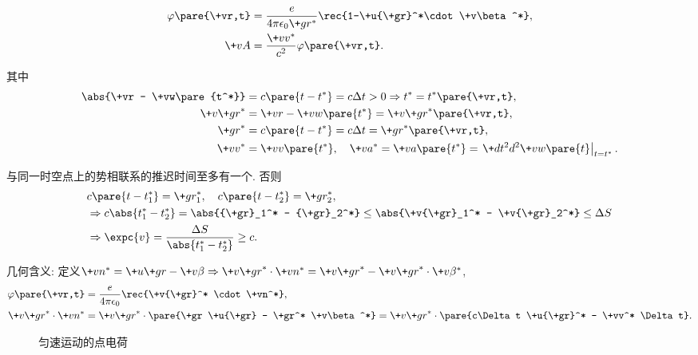 \documentclass[hidelinks]{ctexart}
\begin{document}
\begin{resume}
\vspace{-\baselineskip}
\begin{align*}
    \varphi\pare{\+vr,t} &= \frac{e}{4\pi\epsilon_0 \+gr^*} \rec{1-\+u{\+gr}^*\cdot \+v\beta^*}, \\
    \+vA &= \frac{\+vv^*}{c^2}\varphi\pare{\+vr,t}.
\end{align*}
\end{resume}
\begin{figure}[ht]
    \centering
\end{figure}
\begin{cenum}
    \item 其中
    \begin{align*}
        \abs{\+vr - \+vw\pare{t^*}} &= c\pare{t-t^*} = c\Delta t > 0 \Rightarrow t^* = t^*\pare{\+vr,t}, \\
        \+v{\+gr}^* &= \+vr - \+vw\pare{t^*} = \+v{\+gr}^*\pare{\+vr,t}, \\
        {\+gr}^* &= c\pare{t-t^*} = c\Delta t = {\+gr}^*\pare{\+vr,t}, \\
        \+vv^* &= \+vv\pare{t^*},\quad \+va^* = \+va\pare{t^*} = \left.\+d{t^2}d{^2 \+vw\pare{t}}\right\vert_{t=t^*}.
    \end{align*}
    \item 与同一时空点上的势相联系的推迟时间至多有一个. 否则
    \begin{align*}
        & c\pare{t-t_1^*} = \+gr_1^*,\quad c\pare{t-t_2^*} = \+gr_2^*, \\
        & \Rightarrow c\abs{t_1^* - t_2^*} = \abs{{\+gr}_1^* - {\+gr}_2^*} \le \abs{\+v{\+gr}_1^* - \+v{\+gr}_2^*} \le \Delta S \\
        &\Rightarrow \expc{v} = \frac{\Delta S}{\abs{t_1^* - t_2^*}} \ge c.
    \end{align*}
    \item 几何含义: 定义$\+vn^* = \+u{\+gr} - \+v\beta \Rightarrow \+v{\+gr}^*\cdot \+vn^* = \+v{\+gr}^* - \+v{\+gr}^* \cdot \+v\beta^*$,
    \begin{align*}
        \varphi\pare{\+vr,t} &= \frac{e}{4\pi\epsilon_0}\rec{\+v{\+gr}^* \cdot \+vn^*}, \\
        \+v{\+gr}^* \cdot \+vn^* &= \+v{\+gr}^* \cdot \pare{\+gr \+u{\+gr} - \+gr^* \+v\beta^*} = \+v{\+gr}^* \cdot \pare{c\Delta t \+u{\+gr}^* - \+vv^* \Delta t}.
    \end{align*}
\end{cenum}
\begin{figure}[ht]
    \centering
    \caption{匀速运动的点电荷}
    \label{fig:匀速运动的点电荷}
\end{figure}
\end{document}
